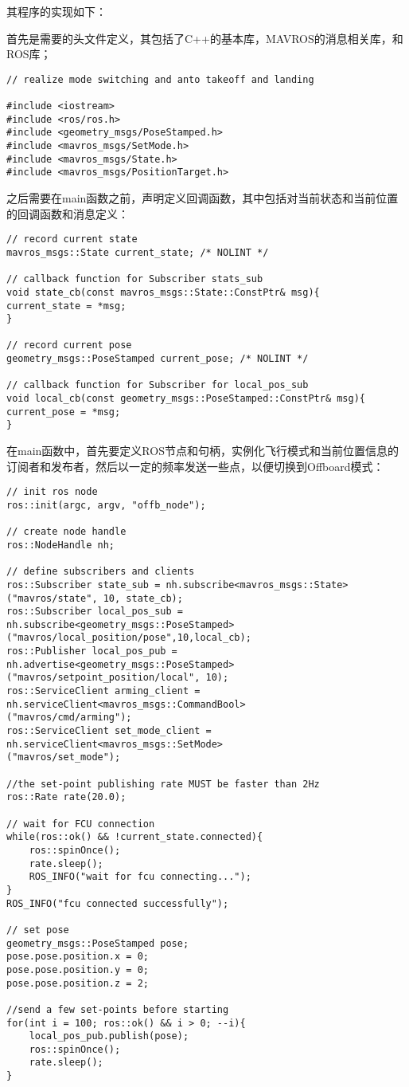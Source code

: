 其程序的实现如下：

首先是需要的头文件定义，其包括了C++的基本库，MAVROS的消息相关库，和ROS库；

\begin{verbatim}
// realize mode switching and anto takeoff and landing

#include <iostream>
#include <ros/ros.h>
#include <geometry_msgs/PoseStamped.h>
#include <mavros_msgs/SetMode.h>
#include <mavros_msgs/State.h>
#include <mavros_msgs/PositionTarget.h>
\end{verbatim}

之后需要在main函数之前，声明定义回调函数，其中包括对当前状态和当前位置的回调函数和消息定义：
\begin{verbatim}
// record current state
mavros_msgs::State current_state; /* NOLINT */

// callback function for Subscriber stats_sub
void state_cb(const mavros_msgs::State::ConstPtr& msg){
current_state = *msg;
}

// record current pose
geometry_msgs::PoseStamped current_pose; /* NOLINT */

// callback function for Subscriber for local_pos_sub
void local_cb(const geometry_msgs::PoseStamped::ConstPtr& msg){
current_pose = *msg;
}
\end{verbatim}

在main函数中，首先要定义ROS节点和句柄，实例化飞行模式和当前位置信息的订阅者和发布者，然后以一定的频率发送一些点，以便切换到Offboard模式：
\begin{verbatim}
// init ros node
ros::init(argc, argv, "offb_node");

// create node handle
ros::NodeHandle nh;

// define subscribers and clients
ros::Subscriber state_sub = nh.subscribe<mavros_msgs::State>
("mavros/state", 10, state_cb);
ros::Subscriber local_pos_sub = nh.subscribe<geometry_msgs::PoseStamped>
("mavros/local_position/pose",10,local_cb);
ros::Publisher local_pos_pub = nh.advertise<geometry_msgs::PoseStamped>
("mavros/setpoint_position/local", 10);
ros::ServiceClient arming_client = nh.serviceClient<mavros_msgs::CommandBool>
("mavros/cmd/arming");
ros::ServiceClient set_mode_client = nh.serviceClient<mavros_msgs::SetMode>
("mavros/set_mode");

//the set-point publishing rate MUST be faster than 2Hz
ros::Rate rate(20.0);

// wait for FCU connection
while(ros::ok() && !current_state.connected){
    ros::spinOnce();
    rate.sleep();
    ROS_INFO("wait for fcu connecting...");
}
ROS_INFO("fcu connected successfully");

// set pose
geometry_msgs::PoseStamped pose;
pose.pose.position.x = 0;
pose.pose.position.y = 0;
pose.pose.position.z = 2;

//send a few set-points before starting
for(int i = 100; ros::ok() && i > 0; --i){
    local_pos_pub.publish(pose);
    ros::spinOnce();
    rate.sleep();
}
\end{verbatim}

